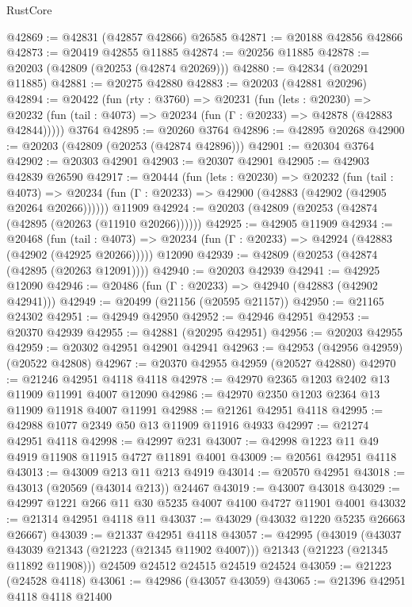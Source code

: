 \begin{lexlean}{RustCore}
\begin{coremodule}
@42869 := @42831 (@42857 @42866) @26585
@42871 := @20188 @42856 @42866
@42873 := @20419 @42855 @11885
@42874 := @20256 @11885
@42878 := @20203 (@42809 (@20253 (@42874 @20269)))
@42880 := @42834 (@20291 @11885)
@42881 := @20275 @42880
@42883 := @20203 (@42881 @20296)
@42894 := @20422
    (fun (rty : @3760) =>
    @20231
      (fun (lets : @20230) =>
      @20232 (fun (tail : @4073) => @20234 (fun (Γ : @20233) => @42878 (@42883 @42844)))))
    @3764
@42895 := @20260 @3764
@42896 := @42895 @20268
@42900 := @20203 (@42809 (@20253 (@42874 @42896)))
@42901 := @20304 @3764
@42902 := @20303 @42901
@42903 := @20307 @42901
@42905 := @42903 @42839 @26590
@42917 := @20444
    (fun (lets : @20230) =>
    @20232
      (fun (tail : @4073) =>
      @20234 (fun (Γ : @20233) => @42900 (@42883 (@42902 (@42905 @20264 @20266))))))
    @11909
@42924 := @20203 (@42809 (@20253 (@42874 (@42895 (@20263 (@11910 @20266))))))
@42925 := @42905 @11909
@42934 := @20468
    (fun (tail : @4073) => @20234 (fun (Γ : @20233) => @42924 (@42883 (@42902 (@42925 @20266)))))
    @12090
@42939 := @42809 (@20253 (@42874 (@42895 (@20263 @12091))))
@42940 := @20203 @42939
@42941 := @42925 @12090
@42946 := @20486 (fun (Γ : @20233) => @42940 (@42883 (@42902 @42941)))
@42949 := @20499 (@21156 (@20595 @21157))
@42950 := @21165 @24302
@42951 := @42949 @42950
@42952 := @42946 @42951
@42953 := @20370 @42939
@42955 := @42881 (@20295 @42951)
@42956 := @20203 @42955
@42959 := @20302 @42951 @42901 @42941
@42963 := @42953 (@42956 @42959) (@20522 @42808)
@42967 := @20370 @42955 @42959 (@20527 @42880)
@42970 := @21246 @42951 @4118 @4118
@42978 := @42970 @2365 @1203 @2402 @13 @11909 @11991 @4007 @12090
@42986 := @42970 @2350 @1203 @2364 @13 @11909 @11918 @4007 @11991
@42988 := @21261 @42951 @4118
@42995 := @42988 @1077 @2349 @50 @13 @11909 @11916 @4933
@42997 := @21274 @42951 @4118
@42998 := @42997 @231
@43007 := @42998 @1223 @11 @49 @4919 @11908 @11915 @4727 @11891 @4001
@43009 := @20561 @42951 @4118
@43013 := @43009 @213 @11 @213 @4919
@43014 := @20570 @42951
@43018 := @43013 (@20569 (@43014 @213)) @24467
@43019 := @43007 @43018
@43029 := @42997 @1221 @266 @11 @30 @5235 @4007 @4100 @4727 @11901 @4001
@43032 := @21314 @42951 @4118 @11
@43037 := @43029 (@43032 @1220 @5235 @26663 @26667)
@43039 := @21337 @42951 @4118
@43057 := @42995
    (@43019
      (@43037 @43039 @21343 (@21223 (@21345 @11902 @4007)))
      @21343
      (@21223 (@21345 @11892 @11908)))
    @24509
    @24512
    @24515
    @24519
    @24524
@43059 := @21223 (@24528 @4118)
@43061 := @42986 (@43057 @43059)
@43065 := @21396 @42951 @4118 @4118 @21400

\end{coremodule}
\end{lexlean}
